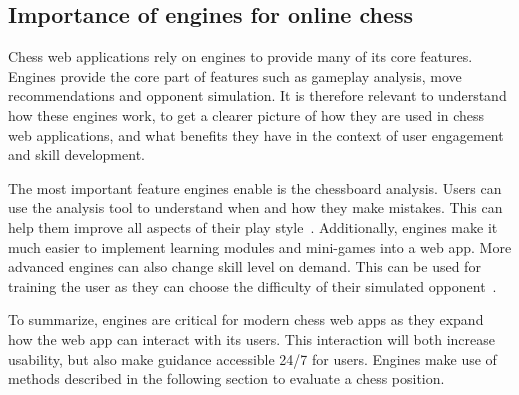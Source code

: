 \subsection{Importance of engines for online chess}\label{subsec:webapps-engines}

Chess web applications rely on engines to provide many of its core features.
Engines provide the core part of features such as gameplay analysis,
move recommendations and opponent simulation.
It is therefore relevant to understand how these engines work,
to get a clearer picture of how they are used in chess web applications,
and what benefits they have in the context of user engagement and skill
development.

The most important feature engines enable is the chessboard analysis.
Users can use the analysis tool to understand when and how they make mistakes.
This can help them improve all aspects of their play style~\cite{chess-com-chess-engines}.
Additionally, engines make it much easier to implement learning modules
and mini-games into a web app.
More advanced engines can also change skill level on demand.
This can be used for training the user as they can choose the difficulty of
their simulated opponent~\cite{chess-com-chess-engines}.

To summarize, engines are critical for modern chess web apps as they
expand how the web app can interact with its users.
This interaction will both increase usability, but also make guidance accessible
24/7 for users.
Engines make use of methods described in the following section to evaluate a chess position.
